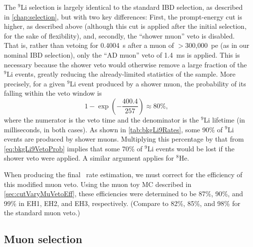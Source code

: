 \documentclass[../thesis.tex]{subfiles}
\begin{document}
The $^9$Li selection is largely identical to the standard IBD selection, as described in \autoref{chap:selection}, but with two key differences: First, the prompt-energy cut is higher, as described above (although this cut is applied after the initial selection, for the sake of flexibility), and, secondly, the ``shower muon'' veto is disabled. That is, rather than vetoing for 0.4004~s after a muon of $>$300,000~pe (as in our nominal IBD selection), only the ``AD muon'' veto of 1.4~ms is applied. This is necessary because the shower veto would otherwise remove a large fraction of the $^9$Li events, greatly reducing the already-limited statistics of the sample. More precisely, for a given $^9$Li event produced by a shower muon, the probability of its falling within the veto window is
\begin{equation}
  \label{eq:bkgLi9VetoProb}
  1 - \exp\left( - \frac{400.4}{257} \right) \approx 80\%,
\end{equation}
where the numerator is the veto time and the denominator is the $^9$Li lifetime (in milliseconds, in both cases). As shown in \autoref{tab:bkgLi9Rates}, some 90\% of $^9$Li events are produced by shower muons. Multiplying this percentage by that from \autoref{eq:bkgLi9VetoProb} implies that some 70\% of $^9$Li events would be lost if the shower veto were applied. A similar argument applies for $^8$He.

When producing the final \linine\ rate estimation, we must correct for the efficiency of this modified muon veto. Using the muon toy MC described in \autoref{sec:cutVaryMuVetoEff}, these efficiencies were determined to be 87\%, 90\%, and 99\% in EH1, EH2, and EH3, respectively. (Compare to 82\%, 85\%, and 98\% for the standard muon veto.)


\subsection{Muon selection}
\label{sec:bkgLi9MuonSel}
\end{document}
